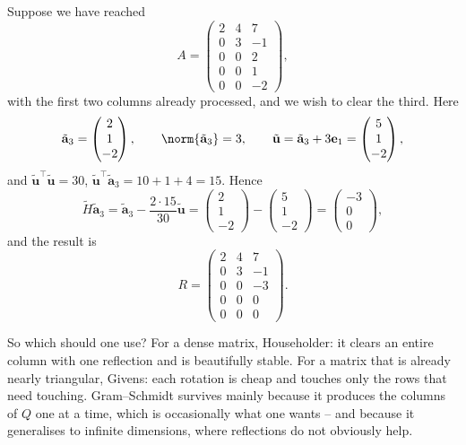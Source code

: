 \begin{example}
  Suppose we have reached
  $$
  A = \begin{pmatrix} 2&4&7\\0&3&-1\\0&0&2\\0&0&1\\0&0&-2\end{pmatrix},
  $$
  with the first two columns already processed, and we wish to clear the third. Here
  $$
  \tilde{\mathbf a}_3 = \begin{pmatrix}2\\1\\-2\end{pmatrix}, \qquad \norm{\tilde{\mathbf a}_3} = 3, \qquad \tilde{\mathbf u} = \tilde{\mathbf a}_3 + 3\mathbf e_1 = \begin{pmatrix}5\\1\\-2\end{pmatrix},
  $$
  and $\tilde{\mathbf u}^\top\tilde{\mathbf u} = 30$, $\tilde{\mathbf u}^\top\tilde{\mathbf a}_3 = 10 + 1 + 4 = 15$. Hence
  $$
  \tilde H\tilde{\mathbf a}_3 = \tilde{\mathbf a}_3 - \frac{2\cdot 15}{30}\tilde{\mathbf u} = \begin{pmatrix}2\\1\\-2\end{pmatrix} - \begin{pmatrix}5\\1\\-2\end{pmatrix} = \begin{pmatrix}-3\\0\\0\end{pmatrix},
  $$
  and the result is
  $$
  R = \begin{pmatrix}2&4&7\\0&3&-1\\0&0&-3\\0&0&0\\0&0&0\end{pmatrix}.
  $$
\end{example}

\begin{remark}
  So which should one use? For a dense matrix, Householder: it clears an entire column with one reflection and is beautifully stable. For a matrix that is already nearly triangular, Givens: each rotation is cheap and touches only the rows that need touching. Gram--Schmidt survives mainly because it produces the columns of $Q$ one at a time, which is occasionally what one wants -- and because it generalises to infinite dimensions, where reflections do not obviously help.
\end{remark}

